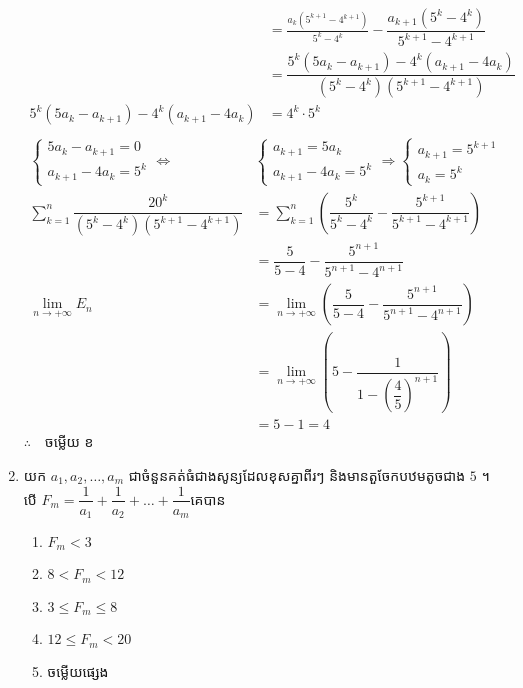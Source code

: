 \documentclass[12pt, a4paper]{article}
\begin{document}
\begin{enumerate}[m]
\begin{center}
\begin{align*}
			&=\frac{a_{k}\left(5^{k+1}-4^{k+1}\right)}{5^k-4^k}-\dfrac{a_{k+1}\left(5^k-4^k\right)}{5^{k+1}-4^{k+1}}\\
			&=\dfrac{5^k\left(5a_{k}-a_{k+1}\right)-4^k\left(a_{k+1}-4a_{k}\right)}{\left(5^k-4^k\right)\left(5^{k+1}-4^{k+1}\right)}\\
			5^k\left(5a_{k}-a_{k+1}\right)-4^k\left(a_{k+1}-4a_{k}\right)&=4^{k}\cdot5^{k}\\
		\end{align*}
		\begin{align*}
			\begin{cases}
				5a_{k}-a_{k+1}=0\\
				a_{k+1}-4a_{k}=5^{k}
			\end{cases}
			\Leftrightarrow&
			\begin{cases}
				a_{k+1}=5a_{k}\\
				a_{k+1}-4a_{k}=5^{k}
			\end{cases}
			\Rightarrow
			\begin{cases}
				a_{k+1}=5^{k+1}\\
				a_{k}=5^{k}
			\end{cases}\\
			\sum_{k=1}^{n}\dfrac{20^k}{\left(5^k-4^k\right)\left(5^{k+1}-4^{k+1}\right)}&=\sum_{k=1}^{n}\left(\dfrac{5^{k}}{5^{k}-4^{k}}-\dfrac{5^{k+1}}{5^{k+1}-4^{k+1}}\right)\\
			&=\dfrac{5}{5-4}-\dfrac{5^{n+1}}{5^{n+1}-4^{n+1}}\\
			\lim\limits_{n \to +\infty}E_n&=\lim\limits_{n \to +\infty}\left(\dfrac{5}{5-4}-\dfrac{5^{n+1}}{5^{n+1}-4^{n+1}}\right)\\
			&=\lim\limits_{n \to +\infty}\left(5-\dfrac{1}{1-\left(\dfrac{4}{5}\right)^{n+1}}\right)\\
			&=5-1=4
		\end{align*}
		$\therefore \quad $\kml ចម្លើយ \kbk ខ
	\end{center}
	{\color{blue}\hrulefill}
	\item យក $a_1,a_2,\dots,a_m$ ជាចំនួនគត់ធំជាងសូន្យដែលខុសគ្នាពីរៗ និងមានតួចែកបឋមតូចជាង $5$ ។ បើ $F_m=\dfrac{1}{a_1}+\dfrac{1}{a_2}+\dots+\dfrac{1}{a_m}$គេបាន\\
	\begin{enumerate}[k,5]
		\item $F_m<3$
		\item $8<F_m<12$
		\item $3\le F_m\le 8$
		\item $12\le F_m<20$
		\item ចម្លើយផ្សេង

\end{enumerate}
\end{enumerate}
\end{document}
